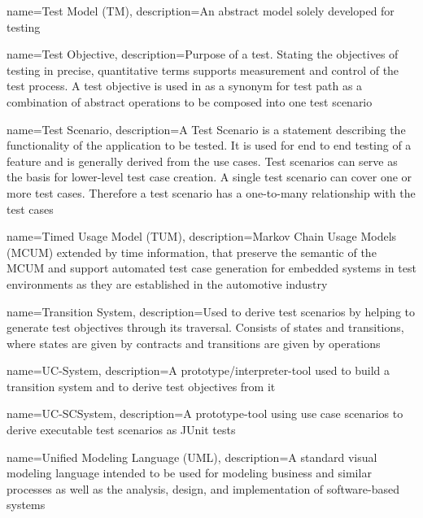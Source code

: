 {
	name={Test Model (TM)},
	description={An abstract model solely developed for testing \cite{Paper1}}
}

{
	name={Test Objective},
	description={Purpose of a test. Stating the objectives of testing in precise, quantitative terms supports measurement and control of the test process. A test objective is used in \cite{ClementineNebut2006} as a synonym for test path as a combination of abstract operations to be composed into one test scenario \cite{SWEBOK, ClementineNebut2006}}
}

{
	name={Test Scenario},
	description={A Test Scenario is a statement describing the functionality of the application to be tested. It is used for end to end testing of a feature and is generally derived from the use cases. Test scenarios can serve as the basis for lower-level test case creation. A single test scenario can cover one or more test cases. Therefore a test scenario has a one-to-many relationship with the test cases \cite{AOTTestScenario}}
}

{
	name={Timed Usage Model (TUM)},
	description={Markov Chain Usage Models (MCUM) extended by time information, that preserve the semantic of the MCUM and support automated test case generation for embedded systems in test environments as they are established in the automotive industry \cite{Siegl2010}}
}

{
	name={Transition System},
	description={Used to derive test scenarios by helping to generate test objectives through its traversal. Consists of states and transitions, where states are given by contracts and transitions are given by operations \cite{ClementineNebut2006}}
}

{
	name={UC-System},
	description={A prototype/interpreter-tool used to build a transition system and to derive test objectives from it \cite{ClementineNebut2006}}
}

{
	name={UC-SCSystem},
	description={A prototype-tool using use case scenarios to derive executable test scenarios as JUnit tests \cite{ClementineNebut2006}}
}

{
	name={Unified Modeling Language (UML)},
	description={A standard visual modeling language intended to be used for modeling business and similar processes as well as the analysis, design, and implementation of software-based systems \cite{UML}}
}

